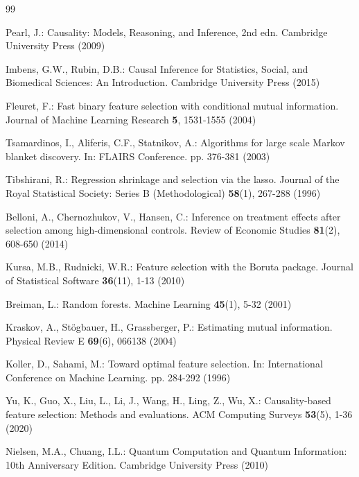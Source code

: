 \documentclass{svproc}
\begin{document}
\begin{thebibliography}{99}

Pearl, J.: Causality: Models, Reasoning, and Inference, 2nd edn. Cambridge University Press (2009)

Imbens, G.W., Rubin, D.B.: Causal Inference for Statistics, Social, and Biomedical Sciences: An Introduction. Cambridge University Press (2015)

Fleuret, F.: Fast binary feature selection with conditional mutual information. Journal of Machine Learning Research \textbf{5}, 1531-1555 (2004)

Tsamardinos, I., Aliferis, C.F., Statnikov, A.: Algorithms for large scale Markov blanket discovery. In: FLAIRS Conference. pp. 376-381 (2003)

Tibshirani, R.: Regression shrinkage and selection via the lasso. Journal of the Royal Statistical Society: Series B (Methodological) \textbf{58}(1), 267-288 (1996)

Belloni, A., Chernozhukov, V., Hansen, C.: Inference on treatment effects after selection among high-dimensional controls. Review of Economic Studies \textbf{81}(2), 608-650 (2014)

Kursa, M.B., Rudnicki, W.R.: Feature selection with the Boruta package. Journal of Statistical Software \textbf{36}(11), 1-13 (2010)

Breiman, L.: Random forests. Machine Learning \textbf{45}(1), 5-32 (2001)

Kraskov, A., St\"{o}gbauer, H., Grassberger, P.: Estimating mutual information. Physical Review E \textbf{69}(6), 066138 (2004)

Koller, D., Sahami, M.: Toward optimal feature selection. In: International Conference on Machine Learning. pp. 284-292 (1996)

Yu, K., Guo, X., Liu, L., Li, J., Wang, H., Ling, Z., Wu, X.: Causality-based feature selection: Methods and evaluations. ACM Computing Surveys \textbf{53}(5), 1-36 (2020)

Nielsen, M.A., Chuang, I.L.: Quantum Computation and Quantum Information: 10th Anniversary Edition. Cambridge University Press (2010)


\end{thebibliography}
\end{document}

